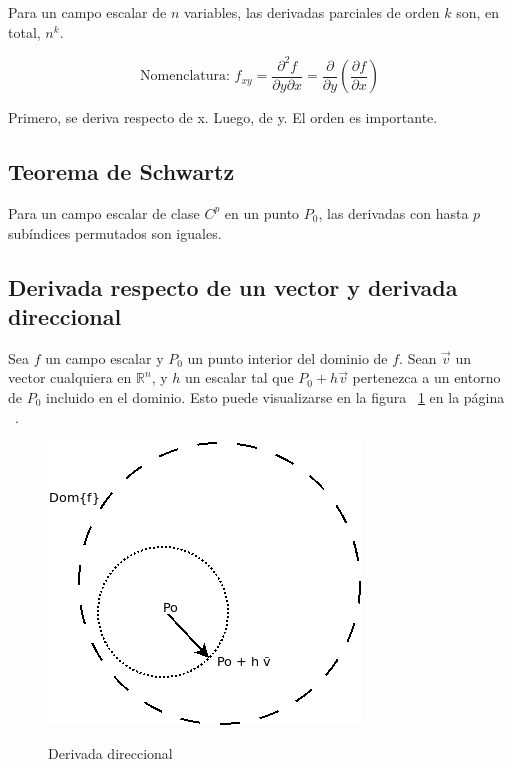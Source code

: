 \documentclass{article}
\renewcommand{\Bbb}{\mathbb}
\begin{document}
Para un campo escalar de $n$ variables, las derivadas parciales de orden $k$ son, en total, $n^k$.

\begin{equation}
\text{Nomenclatura:  } f_{xy} = \frac{\partial^2 f}{\partial y \partial x } = \frac{\partial}{\partial y} \left( \frac{\partial f}{\partial x} \right)
\end{equation}

Primero, se deriva respecto de x. Luego, de y. El orden es importante.

\subsection{Teorema de Schwartz}

Para un campo escalar de clase $C^p$ en un punto $P_0$, las derivadas con hasta $p$ subíndices permutados son iguales.

\subsection{Derivada respecto de un vector y derivada direccional}

Sea $f$ un campo escalar y $P_0$ un punto interior del dominio de $f$. Sean $\overrightarrow{v}$ un vector cualquiera en $\Bbb R^n$, y $h$ un escalar tal que $P_0 + h \overrightarrow{v}$ pertenezca a un entorno de $P_0$ incluido en el dominio. Esto puede visualizarse en la figura ~\ref{fig:deriv_direcc} en la página ~\pageref{fig:deriv_direcc}.

\begin{figure}[t]
\centering
\caption{Derivada direccional}
\includegraphics[scale=0.5]{img/teo_fig004_deriv_direcc.png}
\label{fig:deriv_direcc}
\end{figure}
\end{document}
